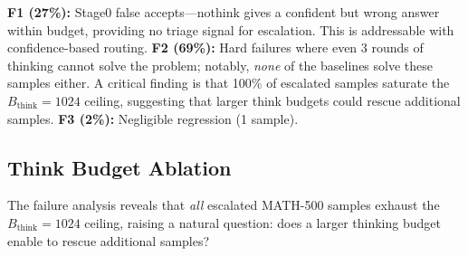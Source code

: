 \textbf{F1 (27\%):} Stage0 false accepts---nothink gives a confident but wrong answer
within budget, providing no triage signal for escalation.
This is addressable with confidence-based routing.
\textbf{F2 (69\%):} Hard failures where even 3 rounds of thinking cannot solve the problem;
notably, \emph{none} of the baselines solve these samples either.
A critical finding is that 100\% of escalated samples saturate the $B_{\text{think}}{=}1024$ ceiling,
suggesting that larger think budgets could rescue additional samples.
\textbf{F3 (2\%):} Negligible regression (1 sample).

\subsection{Think Budget Ablation}
\label{sec:experiments:bthink}

The failure analysis reveals that \emph{all} escalated MATH-500 samples exhaust
the $B_{\text{think}}{=}1024$ ceiling, raising a natural question: does a larger
thinking budget enable \method{} to rescue additional samples?

